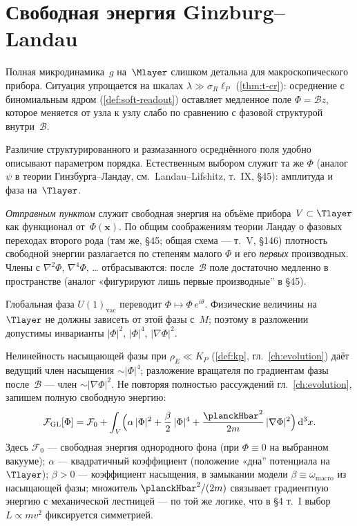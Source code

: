 \section{Свободная энергия Ginzburg--Landau}
\label{sec:gl-free-energy}

Полная микродинамика~$g$ на~$\Mlayer$ слишком детальна для макроскопического прибора.
Ситуация упрощается на шкалах $\lambda\gg\sigma_R\ell_P$ (\cref{thm:t-cr}): осреднение с биномиальным ядром (\cref{def:soft-readout})
оставляет медленное поле $\Phi=\mathcal{B}z$, которое меняется от узла к узлу слабо по сравнению
с фазовой структурой внутри~$\mathcal{B}$.

Различие структурированного и размазанного осреднённого поля удобно описывают параметром порядка.
Естественным выбором служит та же $\Phi$ (аналог $\psi$ в теории Гинзбурга--Ландау, см.~Landau--Lifshitz, т.~IX, \S45):
амплитуда и фаза на~$\Tlayer$.

\emph{Отправным пунктом} служит свободная энергия на объёме прибора~$V\subset\Tlayer$
как функционал от~$\Phi(\mathbf{x})$.
По общим соображениям теории Ландау о фазовых переходах второго рода
(там же, \S45; общая схема --- т.~V, \S146) плотность свободной энергии разлагается
по степеням малого $\Phi$ и его \emph{первых} производных.
Члены с $\nabla^2\Phi$, $\nabla^4\Phi$, \ldots{} отбрасываются: после~$\mathcal{B}$ поле достаточно
медленно в пространстве (аналог «фигурируют лишь первые производные'' в \S45).

Глобальная фаза $U(1)_{\mathrm{vac}}$ переводит $\Phi\mapsto\Phi\,e^{i\theta}$.
Физические величины на~$\Tlayer$ не должны зависеть от этой фазы с~$M$;
поэтому в разложении допустимы инварианты $|\Phi|^2$, $|\Phi|^4$, $|\nabla\Phi|^2$.

Нелинейность насыщающей фазы при $\rho_E\ll K_P$ (\cref{def:kp}, гл.~\ref{ch:evolution})
даёт ведущий член насыщения $\sim|\Phi|^4$; разложение вращателя по градиентам фазы
после~$\mathcal{B}$ --- член $\sim|\nabla\Phi|^2$.
Не повторяя полностью рассуждений гл.~\ref{ch:evolution}, запишем полную свободную энергию:
\begin{equation}
\label{eq:gl-free-energy}
  \mathcal{F}_{\mathrm{GL}}[\Phi]
  = \mathcal{F}_0
  + \int_V \Bigl(
      \alpha\,|\Phi|^2
      + \frac{\beta}{2}\,|\Phi|^4
      + \frac{\planckHbar^2}{2m}\,|\nabla\Phi|^2
    \Bigr)\,\mathrm{d}^3x.
\end{equation}
Здесь $\mathcal{F}_0$ --- свободная энергия однородного фона (при $\Phi\equiv 0$ на выбранном вакууме);
$\alpha$ --- квадратичный коэффициент (положение «дна'' потенциала на~$\Tlayer$);
$\beta>0$ --- коэффициент насыщения, в замыкании модели $\beta\equiv\omega_{\mathrm{macro}}$ из насыщающей фазы;
множитель $\planckHbar^2/(2m)$ связывает градиентную энергию с механической лестницей ---
по той же логике, что в \S4 т.~I выбор $L\propto mv^2$ фиксируется симметрией.


